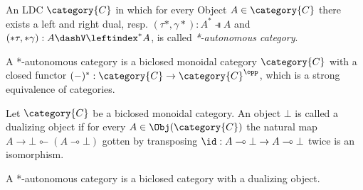 \documentclass[DIN, pagenumber=false, fontsize=11pt, parskip=half, colorinlistoftodos, svgnames]{scrartcl}
\begin{document}
	
		
	
	
	
	\begin{definition}
		\label{def: autoCatSrinivasan}
		An LDC $\category{C} $ in which for every Object $A \in \category{C} $ there exists a left and right dual, resp. $(\tau*, \gamma*): A^* \dashV A $ and $(*\tau, *\gamma): A \dashV \leftindex^* {A} $, is called \emph{*-autonomous category}.
	\end{definition}
	
	
	\iffalse
	\begin{definition}
		\label{def: autoCatBarrA}
		A *-autonomous category is a biclosed monoidal category $\category{C} $ with a closed functor $(-)^*: \category{C} \rightarrow \category{C}^\opp $, which is a strong equivalence of categories.     
	\end{definition}
	
	\begin{definition}
		\label{def: dualizingObj}
		Let $\category{C} $ be a biclosed monoidal category. 
		An object $\bot $ is called a dualizing object if for every $A \in \Obj(\category{C}) $ the natural map $A \rightarrow \bot \multimapinv (A \multimap \bot) $ gotten by transposing $\id: A \multimap \bot \rightarrow A\multimap \bot $ twice is an isomorphism. 
	\end{definition}
	
	\begin{definition}
		\label{def: autoCatBarrB}
		A *-autonomous category is a biclosed category with a dualizing object.
	\end{definition}
	
\end{document}
